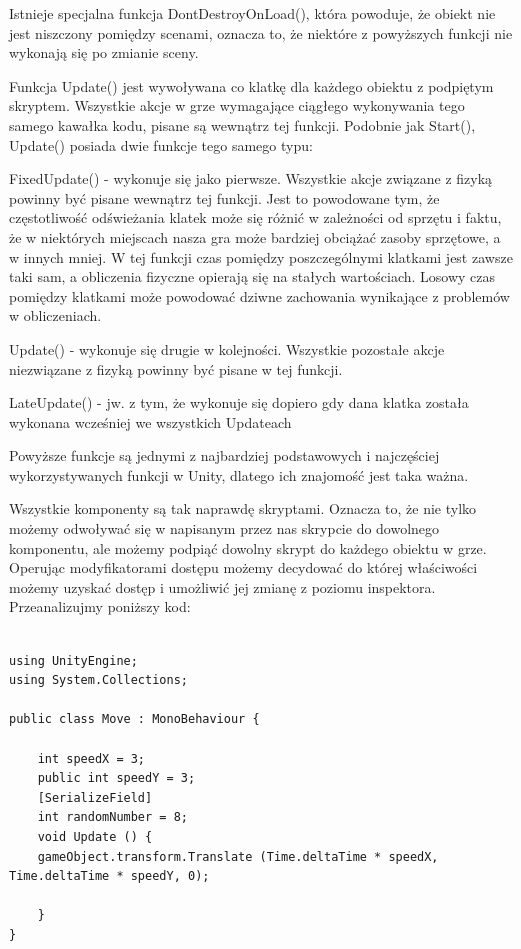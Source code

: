 \documentclass[brudnopis]{xmgr}
\begin{document}
Istnieje specjalna funkcja DontDestroyOnLoad(), która powoduje, że obiekt nie jest niszczony pomiędzy scenami, oznacza to, że niektóre z powyższych funkcji nie wykonają się po zmianie sceny.

Funkcja Update() jest wywoływana co klatkę dla każdego obiektu z podpiętym skryptem. Wszystkie akcje w grze wymagające ciągłego wykonywania tego samego kawałka kodu, pisane są wewnątrz tej funkcji. Podobnie jak Start(), Update() posiada dwie funkcje tego samego typu:

FixedUpdate() - wykonuje się jako pierwsze. Wszystkie akcje związane z fizyką powinny być pisane wewnątrz tej funkcji. Jest to powodowane tym, że częstotliwość odświeżania klatek może się różnić w zależności od sprzętu i faktu, że w niektórych miejscach nasza gra może bardziej obciążać zasoby sprzętowe, a w innych mniej. W tej funkcji czas pomiędzy poszczególnymi klatkami jest zawsze taki sam, a obliczenia fizyczne opierają się na stałych wartościach. Losowy czas pomiędzy klatkami może powodować dziwne zachowania wynikające z problemów w obliczeniach.

Update() - wykonuje się drugie w kolejności. Wszystkie pozostałe akcje niezwiązane z fizyką powinny być pisane w tej funkcji.

LateUpdate() - jw. z tym, że wykonuje się dopiero gdy dana klatka została wykonana wcześniej we wszystkich Updateach

Powyższe funkcje są jednymi z najbardziej podstawowych i najczęściej wykorzystywanych funkcji w Unity, dlatego ich znajomość jest taka ważna.

Wszystkie komponenty są tak naprawdę skryptami. Oznacza to, że nie tylko możemy odwoływać się w napisanym przez nas skrypcie do dowolnego komponentu, ale możemy podpiąć dowolny skrypt do każdego obiektu w grze. Operując modyfikatorami dostępu możemy decydować do której właściwości możemy uzyskać dostęp i umożliwić jej zmianę z poziomu inspektora. Przeanalizujmy poniższy kod:

\newpage
\begin{lstlisting}

using UnityEngine;
using System.Collections;

public class Move : MonoBehaviour {

	int speedX = 3;
	public int speedY = 3;
	[SerializeField]
	int randomNumber = 8;
	void Update () {
	gameObject.transform.Translate (Time.deltaTime * speedX, Time.deltaTime * speedY, 0);

	}
}
\end{lstlisting}
\end{document}
